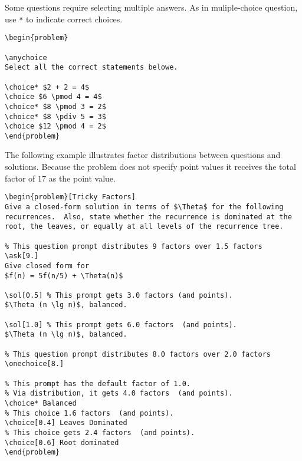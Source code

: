\begin{example}

Some questions require selecting multiple answers.
As in muliple-choice question, use \lstinline`*` to indicate correct choices.

\begin{lstlisting}
\begin{problem}

\anychoice
Select all the correct statements belowe.

\choice* $2 + 2 = 4$
\choice $6 \pmod 4 = 4$
\choice* $8 \pmod 3 = 2$
\choice* $8 \pdiv 5 = 3$
\choice $12 \pmod 4 = 2$
\end{problem}
\end{lstlisting}
\end{example}

\begin{example}
The following example illustrates factor distributions between
questions and solutions.  Because the problem does not specify point
values it receives the total factor of $17$ as the point value.

\begin{lstlisting}
\begin{problem}[Tricky Factors]
Give a closed-form solution in terms of $\Theta$ for the following
recurrences.  Also, state whether the recurrence is dominated at the
root, the leaves, or equally at all levels of the recurrence tree.

% This question prompt distributes 9 factors over 1.5 factors
\ask[9.]
Give closed form for  
$f(n) = 5f(n/5) + \Theta(n)$

\sol[0.5] % This prompt gets 3.0 factors (and points).
$\Theta (n \lg n)$, balanced.

\sol[1.0] % This prompt gets 6.0 factors  (and points).
$\Theta (n \lg n)$, balanced.

% This question prompt distributes 8.0 factors over 2.0 factors 
\onechoice[8.] 

% This prompt has the default factor of 1.0.
% Via distribution, it gets 4.0 factors  (and points). 
\choice* Balanced 
% This choice 1.6 factors  (and points).
\choice[0.4] Leaves Dominated  
% This choice gets 2.4 factors  (and points).
\choice[0.6] Root dominated   
\end{problem}
\end{lstlisting}
\end{example}


